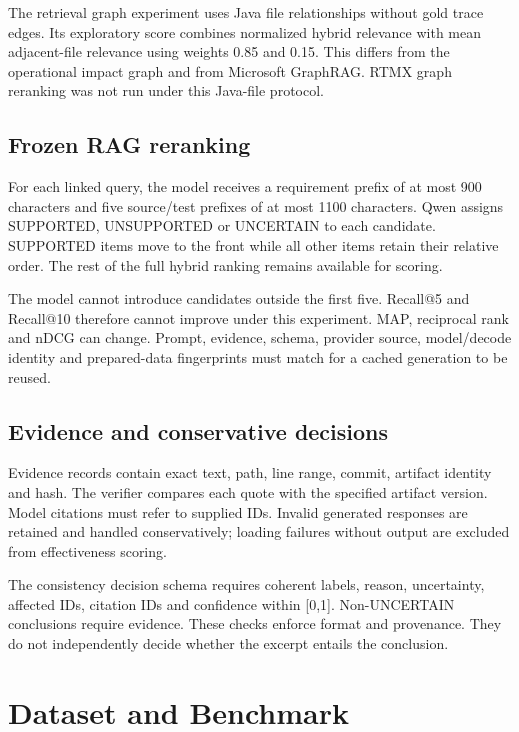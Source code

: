 \documentclass[
  11pt,
  a4paper,
]{report}
\begin{document}
The retrieval graph experiment uses Java file relationships without gold
trace edges. Its exploratory score combines normalized hybrid relevance
with mean adjacent-file relevance using weights 0.85 and 0.15. This
differs from the operational impact graph and from Microsoft GraphRAG.
RTMX graph reranking was not run under this Java-file protocol.

\hypertarget{frozen-rag-reranking}{%
\section{Frozen RAG reranking}\label{frozen-rag-reranking}}

For each linked query, the model receives a requirement prefix of at
most 900 characters and five source/test prefixes of at most 1100
characters. Qwen assigns SUPPORTED, UNSUPPORTED or UNCERTAIN to each
candidate. SUPPORTED items move to the front while all other items
retain their relative order. The rest of the full hybrid ranking remains
available for scoring.

The model cannot introduce candidates outside the first five. Recall@5
and Recall@10 therefore cannot improve under this experiment. MAP,
reciprocal rank and nDCG can change. Prompt, evidence, schema, provider
source, model/decode identity and prepared-data fingerprints must match
for a cached generation to be reused.

\hypertarget{evidence-and-conservative-decisions}{%
\section{Evidence and conservative
decisions}\label{evidence-and-conservative-decisions}}

Evidence records contain exact text, path, line range, commit, artifact
identity and hash. The verifier compares each quote with the specified
artifact version. Model citations must refer to supplied IDs. Invalid
generated responses are retained and handled conservatively; loading
failures without output are excluded from effectiveness scoring.

The consistency decision schema requires coherent labels, reason,
uncertainty, affected IDs, citation IDs and confidence within {[}0,1{]}.
Non-UNCERTAIN conclusions require evidence. These checks enforce format
and provenance. They do not independently decide whether the excerpt
entails the conclusion.

\hypertarget{dataset-and-benchmark}{%
\chapter{Dataset and Benchmark}\label{dataset-and-benchmark}}
\end{document}
